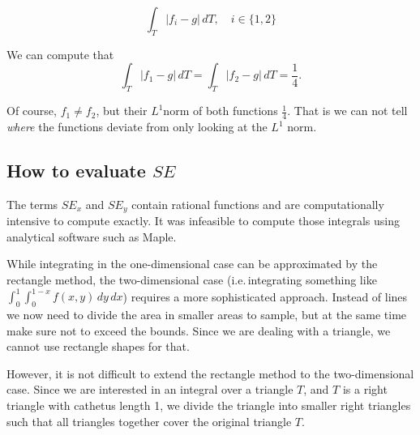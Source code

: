 \documentclass{article}
\newcommand{\done}[2][]{\textcolor{green!50!black}{DONE\ifthenelse{\equal{#1}{}}{}{[#1]}: #2}}
\begin{document}
\begin{equation*}
  \int_T \left| f_i - g \right| \, dT, \quad i \in \{1,2 \}
\end{equation*}

We can compute that
\begin{equation*}
  \int_T \left| f_1 - g \right| \, dT = \int_T \left| f_2 - g \right| \, dT = \frac{1}{4}.
\end{equation*}

Of course, $f_1 \neq f_2$, but their $L^1$norm of both functions $\frac{1}{4}$. That is we can not tell \emph{where} the functions deviate from only looking at the $L^1$ norm.



\subsection{\texorpdfstring{How to evaluate $SE$}{How to evaluate SE}}
\label{sec:how-to-evaluate-e}

The terms $SE_x$ and $SE_y$ contain rational functions and are computationally intensive to compute exactly. It was infeasible to compute those integrals using analytical software such as Maple.

While integrating in the one-dimensional case can be approximated by the rectangle method, the two-dimensional case (i.e.\,integrating something like $\int_{0}^1 \int_0^{1-x} f(x,y)\, dy\, dx$) requires a more sophisticated approach. Instead of lines we now need to divide the area in smaller areas to sample, but at the same time make sure not to exceed the bounds. Since we are dealing with a triangle, we cannot use rectangle shapes for that.

However, it is not difficult to extend the rectangle method to the two-dimensional case. Since we are interested in an integral over a triangle $T$, and $T$ is a right triangle with cathetus length 1, we divide the triangle into smaller right triangles such that all triangles together cover the original triangle $T$.
\end{document}
